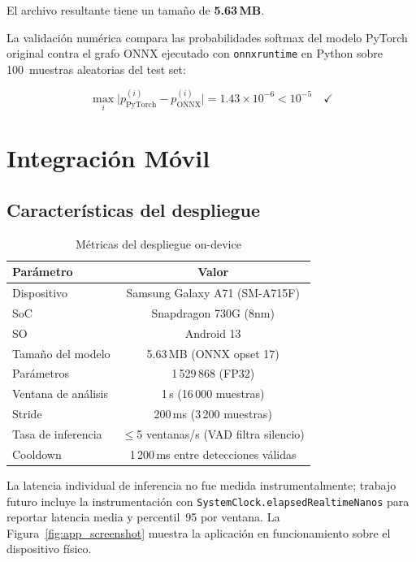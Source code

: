 \documentclass[conference]{IEEEtran}
\begin{document}
El archivo resultante tiene un tamaño de \textbf{5.63\,MB}.

La validación numérica compara las probabilidades softmax del modelo PyTorch
original contra el grafo ONNX ejecutado con \texttt{onnxruntime} en Python
sobre 100~muestras aleatorias del test set:

\begin{equation}
  \max_{i} \bigl| p_\text{PyTorch}^{(i)} - p_\text{ONNX}^{(i)} \bigr|
  = 1.43 \times 10^{-6} < 10^{-5} \quad \checkmark
\end{equation}

\section{Integración Móvil}

\subsection{Características del despliegue}

\begin{table}[htbp]
\caption{Métricas del despliegue on-device}
\label{tab:deploy}
\centering
\begin{tabular}{lc}
\toprule
\textbf{Parámetro} & \textbf{Valor} \\
\midrule
Dispositivo          & Samsung Galaxy A71 (SM-A715F) \\
SoC                  & Snapdragon 730G (8nm) \\
SO                   & Android 13 \\
Tamaño del modelo    & 5.63\,MB (ONNX opset 17) \\
Parámetros           & 1\,529\,868 (FP32) \\
Ventana de análisis  & 1\,s (16\,000 muestras) \\
Stride               & 200\,ms (3\,200 muestras) \\
Tasa de inferencia   & $\leq$5 ventanas/s (VAD filtra silencio) \\
Cooldown             & 1\,200\,ms entre detecciones válidas \\
\bottomrule
\end{tabular}
\end{table}

La latencia individual de inferencia no fue medida instrumentalmente; trabajo
futuro incluye la instrumentación con \texttt{SystemClock.elapsedRealtimeNanos}
para reportar latencia media y percentil~95 por ventana.  La
Figura~\ref{fig:app_screenshot} muestra la aplicación en funcionamiento sobre
el dispositivo físico.
\end{document}
